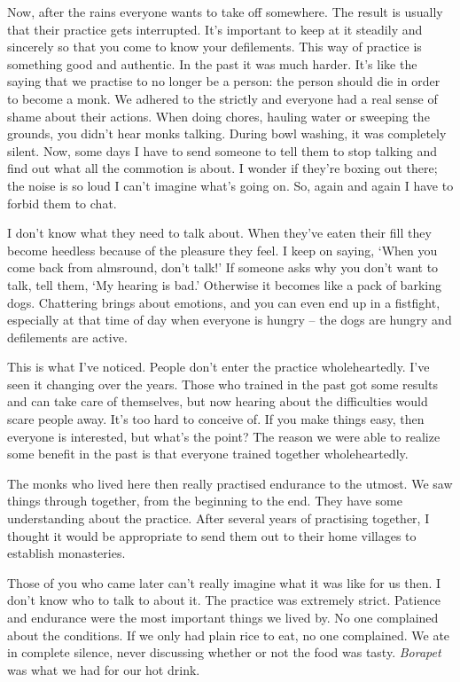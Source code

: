 Now, after the rains everyone wants to take off somewhere. The result is usually that their practice gets interrupted. It's important to keep at it steadily and sincerely so that you come to know your defilements. This way of practice is something good and authentic. In the past it was much harder. It's like the saying that we practise to no longer be a person: the person should die in order to become a monk. We adhered to the  strictly and everyone had a real sense of shame about their actions. When doing chores, hauling water or sweeping the grounds, you didn't hear monks talking. During bowl washing, it was completely silent. Now, some days I have to send someone to tell them to stop talking and find out what all the commotion is about. I wonder if they're boxing out there; the noise is so loud I can't imagine what's going on. So, again and again I have to forbid them to chat. 

I don't know what they need to talk about. When they've eaten their fill they become heedless because of the pleasure they feel. I keep on saying, `When you come back from almsround, don't talk!' If someone asks why you don't want to talk, tell them, `My hearing is bad.' Otherwise it becomes like a pack of barking dogs. Chattering brings about emotions, and you can even end up in a fistfight, especially at that time of day when everyone is hungry -- the dogs are hungry and defilements are active. 

This is what I've noticed. People don't enter the practice wholeheartedly. I've seen it changing over the years. Those who trained in the past got some results and can take care of themselves, but now hearing about the difficulties would scare people away. It's too hard to conceive of. If you make things easy, then everyone is interested, but what's the point? The reason we were able to realize some benefit in the past is that everyone trained together wholeheartedly. 

The monks who lived here then really practised endurance to the utmost. We saw things through together, from the beginning to the end. They have some understanding about the practice. After several years of practising together, I thought it would be appropriate to send them out to their home villages to establish monasteries. 

Those of you who came later can't really imagine what it was like for us then. I don't know who to talk to about it. The practice was extremely strict. Patience and endurance were the most important things we lived by. No one complained about the conditions. If we only had plain rice to eat, no one complained. We ate in complete silence, never discussing whether or not the food was tasty. \textit{Borapet} was what we had for our hot drink. 

